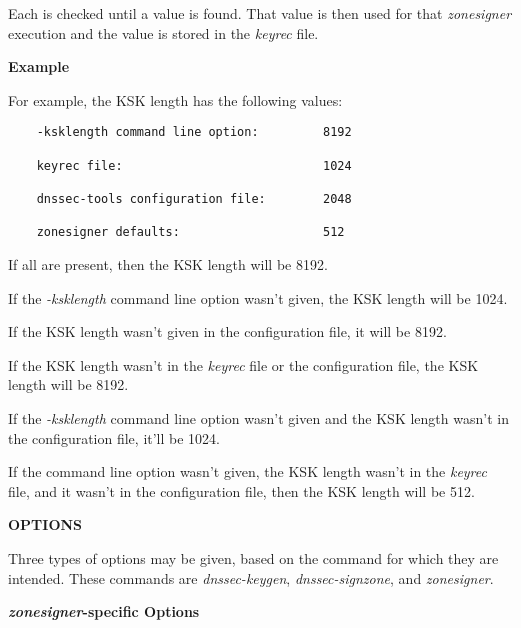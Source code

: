 Each is checked until a value is found.  That value is then used for that
{\it zonesigner} execution and the value is stored in the {\it keyrec} file.

{\bf Example}

For example, the KSK length has the following values:

\begin{verbatim}
    -ksklength command line option:         8192

    keyrec file:                            1024

    dnssec-tools configuration file:        2048

    zonesigner defaults:                    512
\end{verbatim}

If all are present, then the KSK length will be 8192.

If the {\it -ksklength} command line option wasn't given, the KSK length
will be 1024.

If the KSK length wasn't given in the configuration file, it will be 8192.

If the KSK length wasn't in the {\it keyrec} file or the configuration file,
the KSK length will be 8192.

If the {\it -ksklength} command line option wasn't given and the KSK length
wasn't in the configuration file, it'll be 1024.

If the command line option wasn't given, the KSK length wasn't in the
{\it keyrec} file, and it wasn't in the configuration file, then the KSK
length will be 512.

{\bf OPTIONS}

Three types of options may be given, based on the command for which they are
intended.  These commands are  {\it dnssec-keygen}, {\it dnssec-signzone}, and
{\it zonesigner}.

{\bf {\it zonesigner}-specific Options}

